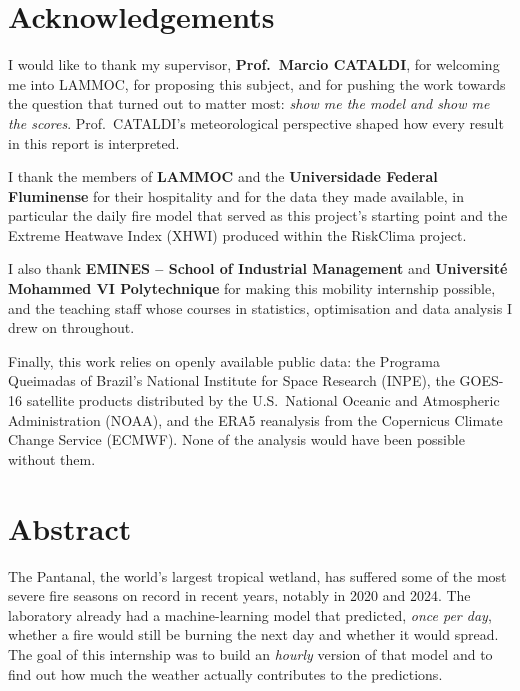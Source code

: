 \documentclass[11pt,a4paper,oneside]{report}
\begin{document}

\chapter*{Acknowledgements}

I would like to thank my supervisor, \textbf{Prof.\ Marcio CATALDI}, for
welcoming me into LAMMOC, for proposing this subject, and for pushing the work
towards the question that turned out to matter most: \emph{show me the model and
show me the scores}. Prof.\ CATALDI's meteorological perspective shaped how every
result in this report is interpreted.

I thank the members of \textbf{LAMMOC} and the \textbf{Universidade Federal
Fluminense} for their hospitality and for the data they made available, in
particular the daily fire model that served as this project's starting point
and the Extreme Heatwave Index (XHWI) produced within the RiskClima project.

I also thank \textbf{EMINES -- School of Industrial Management} and
\textbf{Université Mohammed VI Polytechnique} for making this mobility
internship possible, and the teaching staff whose courses in statistics,
optimisation and data analysis I drew on throughout.

Finally, this work relies on openly available public data: the Programa
Queimadas of Brazil's National Institute for Space Research (INPE), the GOES-16
satellite products distributed by the U.S.\ National Oceanic and Atmospheric
Administration (NOAA), and the ERA5 reanalysis from the Copernicus Climate
Change Service (ECMWF). None of the analysis would have been possible without
them.

\chapter*{Abstract}

The Pantanal, the world's largest tropical wetland, has suffered some of the
most severe fire seasons on record in recent years, notably in 2020 and 2024.
The laboratory already had a machine-learning model that predicted, \emph{once
per day}, whether a fire would still be burning the next day and whether it
would spread. The goal of this internship was to build an \emph{hourly} version
of that model and to find out how much the weather actually contributes to the
predictions.
\end{document}
